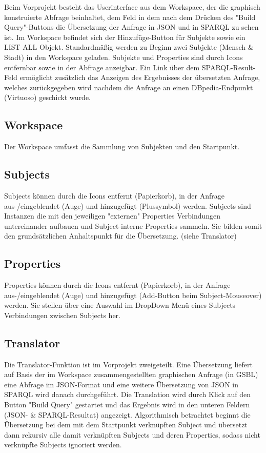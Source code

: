 Beim Vorprojekt besteht das Userinterface aus dem Workspace, der die graphisch konstruierte Abfrage beinhaltet, dem Feld in dem nach dem Drücken des "Build Query"-Buttons die Übersetzung der Anfrage in JSON und in SPARQL zu sehen ist. Im Workspace befindet sich der Hinzufüge-Button für Subjekte sowie ein LIST ALL Objekt. Standardmäßig werden zu Beginn zwei Subjekte (Mensch \& Stadt) in den Workspace geladen. Subjekte und Properties sind durch Icons entfernbar sowie in der Abfrage anzeigbar.
Ein Link über dem SPARQL-Result-Feld ermöglicht zusätzlich das Anzeigen des Ergebnisses der übersetzten Anfrage, welches zurückgegeben wird nachdem die Anfrage an einen DBpedia-Endpunkt (Virtuoso) geschickt wurde.

\subsection*{Workspace}

Der Workspace umfasst die Sammlung von Subjekten und den Startpunkt.

\subsection*{Subjects}

Subjects können durch die Icons entfernt (Papierkorb), in der Anfrage aus-/eingeblendet (Auge) und hinzugefügt (Plussymbol) werden.
Subjects sind Instanzen die mit den jeweiligen "externen" Properties Verbindungen untereinander aufbauen und Subject-interne Properties sammeln. Sie bilden somit den grundsätzlichen
Anhaltspunkt für die Übersetzung. (siehe Translator)

\subsection*{Properties}

Properties können durch die Icons entfernt (Papierkorb), in der Anfrage aus-/eingeblendet (Auge) und hinzugefügt (Add-Button beim Subject-Mouseover) werden.
Sie stellen über eine Auswahl im DropDown Menü eines Subjects Verbindungen zwischen Subjects her.

\subsection*{Translator}
\Hack{\enlargethispage{\baselineskip}}
Die Translator-Funktion ist im Vorprojekt zweigeteilt. Eine Übersetzung liefert auf Basis der im Workspace zusammengestellten graphischen Anfrage (in GSBL) eine Abfrage im
JSON-Format und eine weitere Übersetzung von JSON in SPARQL wird danach durchgeführt.
Die Translation wird durch Klick auf den Button "Build Query" gestartet und das Ergebnis wird in den unteren Feldern (JSON- \& SPARQL-Resultat) angezeigt.
Algorithmisch betrachtet beginnt die Übersetzung bei dem mit dem Startpunkt verknüpften Subject und übersetzt dann rekursiv alle damit verknüpften Subjects und deren Properties, sodass nicht verknüpfte Subjects ignoriert werden. 

